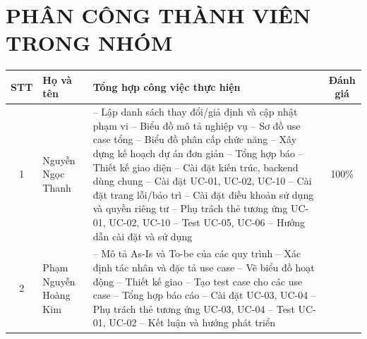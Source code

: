 \chapter*{PHÂN CÔNG THÀNH VIÊN TRONG NHÓM}

\begin{longtable}{|c|p{5cm}|p{6.5cm}|c|}
    \hline
    \textbf{STT} & \textbf{Họ và tên} & \textbf{Tổng hợp công việc thực hiện} & \textbf{Đánh giá} \\ \hline
    \endhead
    1 & Nguyễn Ngọc Thanh & -- Lập danh sách thay đổi/giả định và cập nhật phạm vi 
    \newline -- Biểu đồ mô tả nghiệp vụ
    \newline -- Sơ đồ use case tổng 
    \newline -- Biểu đồ phân cấp chức năng
    \newline -- Xây dựng kế hoạch dự án đơn giản
    \newline -- Tổng hợp báo 
    \newline -- Thiết kế giao diện
    \newline -- Cài đặt kiến trúc, backend dùng chung
    \newline -- Cài đặt UC-01, UC-02, UC-10
    \newline -- Cài đặt trang lỗi/bảo trì
    \newline -- Cài đặt điều khoản sử dụng và quyền riêng tư
    \newline -- Phụ trách thẻ tương ứng UC-01, UC-02, UC-10
    \newline -- Test UC-05, UC-06
    \newline -- Hướng dẫn cài đặt và sử dụng
    & 100\% \\ \hline
    2 & Phạm Nguyễn Hoàng Kim & -- Mô tả As-Is và To-be của các quy trình 
    \newline -- Xác định tác nhân và đặc tả use case
    \newline -- Vẽ biểu đồ hoạt động
    \newline -- Thiết kế giao 
    \newline -- Tạo test case cho các use case
    \newline -- Tổng hợp báo cáo
    \newline -- Cài đặt UC-03, UC-04 
    \newline -- Phụ trách thẻ tương ứng UC-03, UC-04
    \newline -- Test UC-01, UC-02
    \newline -- Kết luận và hướng phát triển

\end{longtable}

